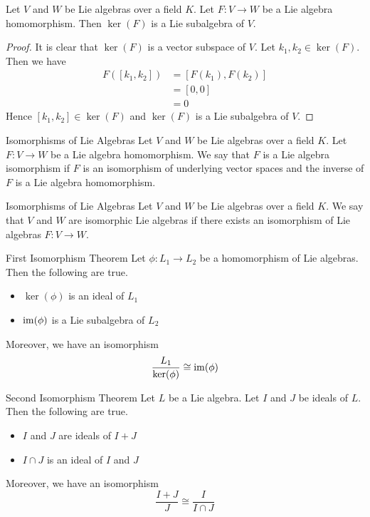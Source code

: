 \documentclass[a4paper]{article}
\begin{document}
\begin{lmm}{}{} Let $V$ and $W$ be Lie algebras over a field $K$. Let $F:V\to W$ be a Lie algebra homomorphism. Then $\ker(F)$ is a Lie subalgebra of $V$. \tcbline
\begin{proof}
It is clear that $\ker(F)$ is a vector subspace of $V$. Let $k_1,k_2\in\ker(F)$. Then we have 
\begin{align*}
F([k_1,k_2])&=[F(k_1),F(k_2)]\tag{$F$ is a Lie algebra homomorphism}\\
&=[0,0]\\
&=0
\end{align*}
Hence $[k_1,k_2]\in\ker(F)$ and $\ker(F)$ is a Lie subalgebra of $V$. 
\end{proof}
\end{lmm}

\begin{defn}{Isomorphisms of Lie Algebras}{} Let $V$ and $W$ be Lie algebras over a field $K$. Let $F:V\to W$ be a Lie algebra homomorphism. We say that $F$ is a Lie algebra isomorphism if $F$ is an isomorphism of underlying vector spaces and the inverse of $F$ is a Lie algebra homomorphism. 
\end{defn}

\begin{defn}{Isomorphisms of Lie Algebras}{} Let $V$ and $W$ be Lie algebras over a field $K$. We say that $V$ and $W$ are isomorphic Lie algebras if there exists an isomorphism of Lie algebras $F:V\to W$. 
\end{defn}
\begin{thm}{First Isomorphism Theorem}{} Let $\phi:L_1\to L_2$ be a homomorphism of Lie algebras. Then the following are true. 
\begin{itemize}
\item $\ker(\phi)$ is an ideal of $L_1$
\item $\operatorname{im}(\phi)$ is a Lie subalgebra of $L_2$
\end{itemize}
Moreover, we have an isomorphism $$\frac{L_1}{\ker(\phi)}\cong\operatorname{im}(\phi)$$
\end{thm}

\begin{thm}{Second Isomorphism Theorem}{} Let $L$ be a Lie algebra. Let $I$ and $J$ be ideals of $L$. Then the following are true. 
\begin{itemize}
\item $I$ and $J$ are ideals of $I+J$
\item $I\cap J$ is an ideal of $I$ and $J$
\end{itemize}
Moreover, we have an isomorphism $$\frac{I+J}{J}\cong\frac{I}{I\cap J}$$
\end{thm}
\end{document}
